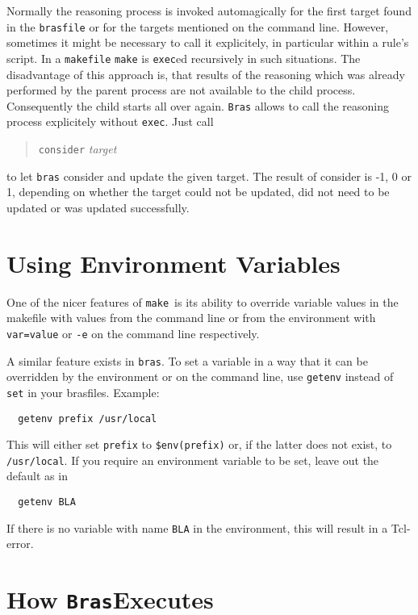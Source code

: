 \documentclass[12pt]{article}
\newcommand{\bras}{\texttt{bras}}
\newcommand{\Bras}{\texttt{Bras}}
\newcommand{\make}{\texttt{make}}
\newcommand{\brasfile}{\texttt{brasfile}}
\begin{document}
Normally the reasoning process is invoked automagically for the first
target found in the \brasfile{} or for the targets mentioned on the
command line. However, sometimes it might be necessary to call it
explicitely, in particular within a rule's script. In a
\texttt{makefile} \make{} is \texttt{exec}ed recursively in such
situations. The disadvantage of this approach is, that results of
the reasoning which was already performed by the parent process are not
available to the child process. Consequently the child starts all over
again. \Bras{} allows to call the reasoning process explicitely
without \texttt{exec}. Just call

\begin{quote}
  \texttt{consider} \textit{target}
\end{quote}

to let \bras{} consider and update the given target. The result of
consider is -1, 0 or 1, depending on whether the target could not be
updated, did not need to be updated or was updated successfully.

\section{Using Environment Variables}
One of the nicer features of \make\ is its ability to override
variable values in the makefile with values from the command line or
from the environment with \texttt{var=value} or \texttt{-e}
on the command line respectively. 

A similar feature exists in \bras. To set a variable in a way that it
can be overridden by the environment or on the command line, use
\texttt{getenv} instead of \texttt{set} in your brasfiles. Example:
\begin{verbatim}
  getenv prefix /usr/local
\end{verbatim}
This will either set \texttt{prefix} to \texttt{\$env(prefix)} or, if
the latter does not exist, to \texttt{/usr/local}. If you require an
environment variable to be set, leave out the default as in
\begin{verbatim}
  getenv BLA
\end{verbatim}
If there is no variable with name
\texttt{BLA} in the environment, this will result in a Tcl-error.

\section{How \Bras Executes}
\end{document}
